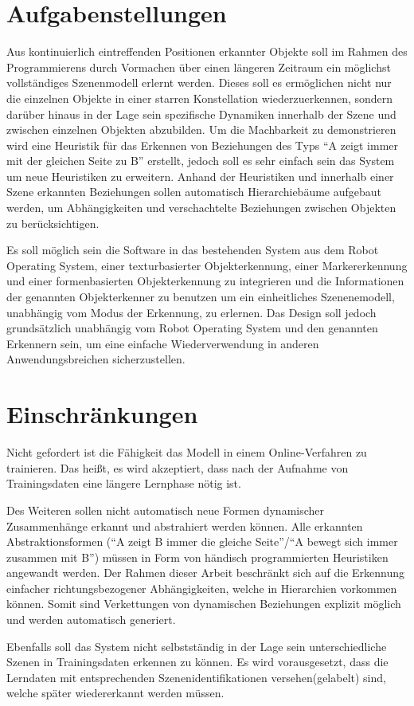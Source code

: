 \section{Aufgabenstellungen}

Aus kontinuierlich eintreffenden Positionen erkannter Objekte soll im Rahmen des Programmierens durch Vormachen über einen längeren Zeitraum ein möglichst vollständiges Szenenmodell erlernt werden.
Dieses soll es ermöglichen nicht nur die einzelnen Objekte in einer starren Konstellation wiederzuerkennen, sondern darüber hinaus in der Lage sein spezifische Dynamiken innerhalb der Szene und zwischen einzelnen Objekten abzubilden.
Um die Machbarkeit zu demonstrieren wird eine Heuristik für das Erkennen von Beziehungen des Typs "`A zeigt immer mit der gleichen Seite zu B"' erstellt, jedoch soll es sehr einfach sein das System um neue Heuristiken zu erweitern.
Anhand der Heuristiken und innerhalb einer Szene erkannten Beziehungen sollen automatisch Hierarchiebäume aufgebaut werden, um Abhängigkeiten und verschachtelte Beziehungen zwischen Objekten zu berücksichtigen.

Es soll möglich sein die Software in das bestehenden System aus dem Robot Operating System, einer texturbasierter Objekterkennung, einer Markererkennung und einer formenbasierten Objekterkennung zu integrieren und die Informationen der genannten Objekterkenner zu benutzen um ein einheitliches Szenenemodell, unabhängig vom Modus der Erkennung, zu erlernen.
Das Design soll jedoch grundsätzlich unabhängig vom Robot Operating System und den genannten Erkennern sein, um eine einfache Wiederverwendung in anderen Anwendungsbreichen sicherzustellen.

\section{Einschränkungen}

Nicht gefordert ist die Fähigkeit das Modell in einem Online-Verfahren zu trainieren.
Das heißt, es wird akzeptiert, dass nach der Aufnahme von Trainingsdaten eine längere Lernphase nötig ist.

Des Weiteren sollen nicht automatisch neue Formen dynamischer Zusammenhänge erkannt und abstrahiert werden können.
Alle erkannten Abstraktionsformen ("`A zeigt B immer die gleiche Seite"'/"`A bewegt sich immer zusammen mit B"') müssen in Form von händisch programmierten Heuristiken angewandt werden.
Der Rahmen dieser Arbeit beschränkt sich auf die Erkennung einfacher richtungsbezogener Abhängigkeiten, welche in Hierarchien vorkommen können.
Somit sind Verkettungen von dynamischen Beziehungen explizit möglich und werden automatisch generiert.

Ebenfalls soll das System nicht selbstständig in der Lage sein unterschiedliche Szenen in Trainingsdaten erkennen zu können. Es wird vorausgesetzt, dass die Lerndaten mit entsprechenden Szenenidentifikationen versehen(gelabelt) sind, welche später wiedererkannt werden müssen.

